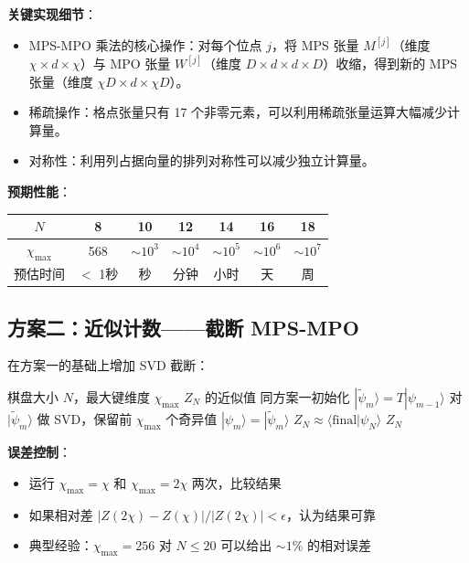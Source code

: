 \documentclass[12pt,a4paper]{ctexart}
\begin{document}
\textbf{关键实现细节}：
\begin{itemize}
\item MPS-MPO 乘法的核心操作：对每个位点 $j$，将 MPS 张量 $M^{[j]}$（维度 $\chi \times d \times \chi$）与 MPO 张量 $W^{[j]}$（维度 $D \times d \times d \times D$）收缩，得到新的 MPS 张量（维度 $\chi D \times d \times \chi D$）。
\item 稀疏操作：格点张量只有 17 个非零元素，可以利用稀疏张量运算大幅减少计算量。
\item 对称性：利用列占据向量的排列对称性可以减少独立计算量。
\end{itemize}

\textbf{预期性能}：
\begin{center}
\begin{tabular}{c|cccccc}
\toprule
$N$ & 8 & 10 & 12 & 14 & 16 & 18 \\
\midrule
$\chi_{\max}$ & 568 & $\sim 10^3$ & $\sim 10^4$ & $\sim 10^5$ & $\sim 10^6$ & $\sim 10^7$ \\
预估时间 & $<$ 1秒 & 秒 & 分钟 & 小时 & 天 & 周 \\
\bottomrule
\end{tabular}
\end{center}

\subsection{方案二：近似计数——截断 MPS-MPO}

在方案一的基础上增加 SVD 截断：

\begin{algorithm}[H]
\caption{近似 MPS-MPO 计算 $Z_N$}
\begin{algorithmic}[1]
\REQUIRE 棋盘大小 $N$，最大键维度 $\chi_{\max}$
\ENSURE $Z_N$ 的近似值
\STATE 同方案一初始化
    \STATE $|\widetilde{\psi}_m\rangle = T |\psi_{m-1}\rangle$ 
    \IF{$\chi > \chi_{\max}$}
        \STATE 对 $|\widetilde{\psi}_m\rangle$ 做 SVD，保留前 $\chi_{\max}$ 个奇异值
    \ENDIF
    \STATE $|\psi_m\rangle = |\widetilde{\psi}_m\rangle$
\ENDFOR
\STATE $Z_N \approx \langle \text{final} | \psi_N \rangle$
\RETURN $Z_N$
\end{algorithmic}
\end{algorithm}

\textbf{误差控制}：
\begin{itemize}
\item 运行 $\chi_{\max} = \chi$ 和 $\chi_{\max} = 2\chi$ 两次，比较结果
\item 如果相对差 $|Z(2\chi) - Z(\chi)| / |Z(2\chi)| < \epsilon$，认为结果可靠
\item 典型经验：$\chi_{\max} = 256$ 对 $N \leq 20$ 可以给出 $\sim 1\%$ 的相对误差
\end{itemize}
\end{document}
